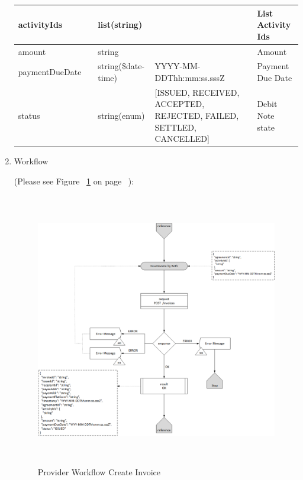 \begin{enumerate}
\begin{table}[H]
\begin{center}
\begin{tabular}{|p{3cm}|l|p{3cm}|p{3cm}|p{4cm}|}
activityIds				& 	& 	list(string)		&																		&	List Activity Ids \\ 
\hline

amount					& 	& 	string				&																		&	Amount  \\ 
\hline

paymentDueDate			&   &	string(\$date-time)	&	YYYY-MM-DDThh:mm:ss.sssZ											&	Payment Due Date \\
\hline

status					&	&	string(enum)		&	[ISSUED, RECEIVED, ACCEPTED, REJECTED, FAILED, SETTLED, CANCELLED]	& 	Debit Note state \\	
\hline

\end{tabular}
\end{center}
\end{table}

\item Workflow

(Please see Figure ~\ref{fig:PCI} on page ~\pageref{fig:PCI}):

\begin{figure}[htbp]
    \centering
    \includegraphics[width=12cm,height=12cm,angle=0]{./diag/Workflow/Payment/IssueInvoice-B-Workflow.png}
    \caption{Provider Workflow Create Invoice }
	\label{fig:PCI}
\end{figure}


\end{enumerate}

